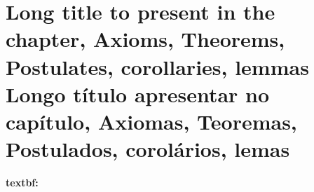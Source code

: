 

\chapter[\lang{Abbreviation for the Table of Contents}{Abreviação para o Sumário}]
 {
  \lang
  {Long title to present in the chapter, Axioms, Theorems, Postulates, corollaries, lemmas}
  {Longo título apresentar no capítulo, Axiomas, Teoremas, Postulados, corolários, lemas}
 }

\label{cap_exemplos}


\begin{flushright}
    \englishword{\showfont}
\end{flushright}

\sloppy
\textbf{textbf: \englishword{\showfont}}
\fussy



